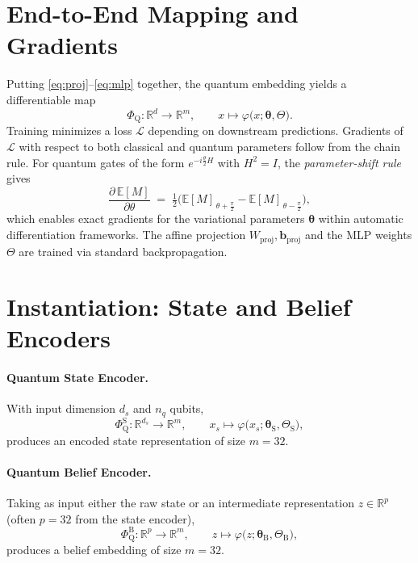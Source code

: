 \documentclass[11pt]{article}
\begin{document}
\section{End-to-End Mapping and Gradients}

Putting \eqref{eq:proj}--\eqref{eq:mlp} together, the quantum embedding yields a differentiable map
\begin{equation}
\Phi_{\mathrm{Q}}: \mathbb{R}^{d}\to\mathbb{R}^{m},\qquad x\mapsto \varphi\big(x;\bm{\theta},\Theta\big).
\end{equation}
Training minimizes a loss $\mathcal{L}$ depending on downstream predictions. Gradients of $\mathcal{L}$ with respect to both classical and quantum parameters follow from the chain rule. For quantum gates of the form $e^{-i\tfrac{\theta}{2} H}$ with $H^2=I$, the \emph{parameter-shift rule} gives
\begin{equation}
\label{eq:psr}
\frac{\partial\,\mathbb{E}[M]}{\partial\theta}\;=\;\tfrac{1}{2}\Big( \mathbb{E}[M]_{\,\theta+\tfrac{\pi}{2}} - \mathbb{E}[M]_{\,\theta-\tfrac{\pi}{2}} \Big),
\end{equation}
which enables exact gradients for the variational parameters $\bm{\theta}$ within automatic differentiation frameworks. The affine projection $W_{\mathrm{proj}},\bm{b}_{\mathrm{proj}}$ and the MLP weights $\Theta$ are trained via standard backpropagation.

\section{Instantiation: State and Belief Encoders}

\paragraph{Quantum State Encoder.} With input dimension $d_s$ and $n_q$ qubits,
\begin{equation}
\Phi_{\mathrm{Q}}^{\mathrm{S}}: \mathbb{R}^{d_s}\to\mathbb{R}^{m},\qquad x_s\mapsto \varphi\big(x_s;\bm{\theta}_{\mathrm{S}},\Theta_{\mathrm{S}}\big),
\end{equation}
produces an encoded state representation of size $m=32$.

\paragraph{Quantum Belief Encoder.} Taking as input either the raw state or an intermediate representation $z\in\mathbb{R}^{p}$ (often $p=32$ from the state encoder),
\begin{equation}
\Phi_{\mathrm{Q}}^{\mathrm{B}}: \mathbb{R}^{p}\to\mathbb{R}^{m},\qquad z\mapsto \varphi\big(z;\bm{\theta}_{\mathrm{B}},\Theta_{\mathrm{B}}\big),
\end{equation}
produces a belief embedding of size $m=32$.
\end{document}
